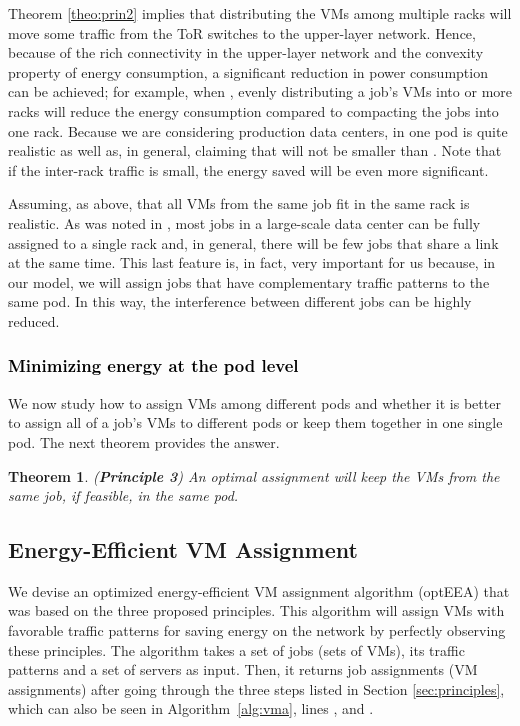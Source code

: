 \documentclass[journal,single-space,two column,twoside,10pt]{IEEEtran}
\newtheorem{theorem}{Theorem}
\begin{document}
Theorem \ref{theo:prin2} implies that distributing the VMs among multiple racks will move some traffic from the ToR switches to the upper-layer network. Hence, because of the rich connectivity in the upper-layer network and the convexity property of energy consumption, a significant reduction in power consumption can be achieved; for example, when , evenly distributing a job's VMs into  or more racks will reduce the energy consumption compared to compacting the jobs into one rack. Because we are considering production data centers,  in one pod is quite realistic as well as, in general, claiming that  will not be smaller than . Note that if the inter-rack traffic is small, the energy saved will be even more significant.

Assuming, as above, that all VMs from the same job fit in the same rack is realistic. As was noted in \cite{Xie_Ding-2012}, most jobs in a large-scale data center can be fully assigned to a single rack and, in general, there will be few jobs that share a link at the same time. This last feature is, in fact, very important for us because, in our model, we will assign jobs that have complementary traffic patterns to the same pod. In this way, the interference between different jobs can be highly reduced.

\subsubsection{\textcolor{black}{Minimizing energy at the pod level}}

We now study how to assign VMs among different pods and whether it is better to assign all of a job's VMs to different pods or keep them together in one single pod. The next theorem provides the answer.

\begin{theorem}
(\textbf{Principle 3}) An optimal assignment will keep the VMs from the same job, if feasible, in the same pod.
\end{theorem}


\subsection{Energy-Efficient VM Assignment}

We devise an optimized energy-efficient VM assignment algorithm (optEEA) that was based on the three proposed principles. This algorithm will assign VMs with favorable traffic patterns for saving energy on the network by perfectly observing these principles. The algorithm takes a set of jobs (sets of VMs), its traffic patterns and a set of servers as input. Then, it returns job assignments (VM assignments) after going through the three steps listed in Section \ref{sec:principles}, which can also be seen in Algorithm~\ref{alg:vma}, lines , and .
\end{document}
